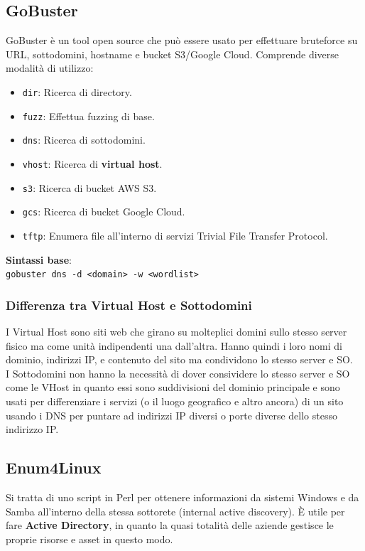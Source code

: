 \documentclass{article}
\begin{document}
\subsection{GoBuster}
GoBuster è un tool open source che può essere usato per effettuare bruteforce su URL, sottodomini, hostname e bucket S3/Google Cloud. Comprende diverse modalità di utilizzo:
\begin{itemize}
    \item \verb|dir|: Ricerca di directory.
    \item \verb|fuzz|: Effettua fuzzing di base.
    \item \verb|dns|: Ricerca di sottodomini.
    \item \verb|vhost|: Ricerca di \textbf{virtual host}.
    \item \verb|s3|: Ricerca di bucket AWS S3.
    \item \verb|gcs|: Ricerca di bucket Google Cloud.
    \item \verb|tftp|: Enumera file all’interno di servizi Trivial File Transfer Protocol.
\end{itemize}

\textbf{Sintassi base}:\\
\verb|gobuster dns -d <domain> -w <wordlist>|

\subsubsection{Differenza tra Virtual Host e Sottodomini}
I Virtual Host sono siti web che girano su molteplici domini sullo stesso server fisico ma come unità indipendenti una dall'altra. Hanno quindi i loro nomi di dominio, indirizzi IP, e contenuto del sito ma condividono lo stesso server e SO.\\
I Sottodomini non hanno la necessità di dover consividere lo stesso server e SO come le VHost in quanto essi sono suddivisioni del dominio principale e sono usati per differenziare i servizi (o il luogo geografico e altro ancora) di un sito usando i DNS per puntare ad indirizzi IP diversi o porte diverse dello stesso indirizzo IP. 

\subsection{Enum4Linux}
Si tratta di uno script in Perl per ottenere informazioni da sistemi Windows e da Samba all’interno della stessa sottorete (internal active discovery). È utile per fare \textbf{Active Directory}, in quanto la quasi totalità delle aziende gestisce le proprie risorse e asset in questo modo.
\end{document}
